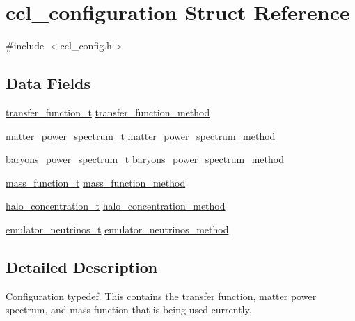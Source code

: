 \hypertarget{structccl__configuration}{}\section{ccl\+\_\+configuration Struct Reference}
\label{structccl__configuration}


{\ttfamily \#include $<$ccl\+\_\+config.\+h$>$}

\subsection*{Data Fields}
\begin{DoxyCompactItemize}
\item 
\mbox{\hyperlink{ccl__config_8h_a8746e6d3648e86a8233d4c2813415e15}{transfer\+\_\+function\+\_\+t}} \mbox{\hyperlink{structccl__configuration_aad3d79052deba5c55552e6fd70a5a1ec}{transfer\+\_\+function\+\_\+method}}
\item 
\mbox{\hyperlink{ccl__config_8h_a33c02fcf871bde5a88799d19418fb615}{matter\+\_\+power\+\_\+spectrum\+\_\+t}} \mbox{\hyperlink{structccl__configuration_a9768940f8bac8bfdeccc56e986a5d1d0}{matter\+\_\+power\+\_\+spectrum\+\_\+method}}
\item 
\mbox{\hyperlink{ccl__config_8h_a834a8dab508cb785c7fdcc3b6353a013}{baryons\+\_\+power\+\_\+spectrum\+\_\+t}} \mbox{\hyperlink{structccl__configuration_af9c3d2fe0892f004457699c01f01b2f0}{baryons\+\_\+power\+\_\+spectrum\+\_\+method}}
\item 
\mbox{\hyperlink{ccl__config_8h_ad544e91cedc9b0865dba11bf4c652091}{mass\+\_\+function\+\_\+t}} \mbox{\hyperlink{structccl__configuration_abf81fb40ac4629c1a91bf90775dbcbc1}{mass\+\_\+function\+\_\+method}}
\item 
\mbox{\hyperlink{ccl__config_8h_a62567120aeaafb79d8467612498cc7ed}{halo\+\_\+concentration\+\_\+t}} \mbox{\hyperlink{structccl__configuration_a7bae327664440ffbc90907f12d1d9811}{halo\+\_\+concentration\+\_\+method}}
\item 
\mbox{\hyperlink{ccl__config_8h_ac78b0a571f13119cf2bd5a3ff4b85192}{emulator\+\_\+neutrinos\+\_\+t}} \mbox{\hyperlink{structccl__configuration_a26c550f4cdb6dd645edd568e6ad84948}{emulator\+\_\+neutrinos\+\_\+method}}
\end{DoxyCompactItemize}


\subsection{Detailed Description}
Configuration typedef. This contains the transfer function, matter power spectrum, and mass function that is being used currently. 

